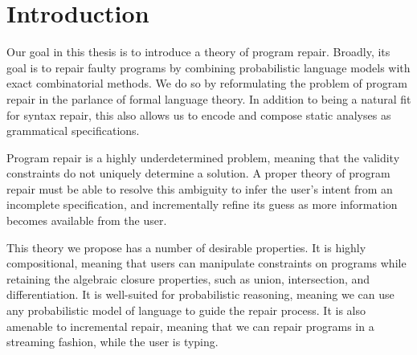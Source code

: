 \chapter*{\rm\bfseries Introduction}
\label{ch:introduction}


Our goal in this thesis is to introduce a theory of program repair. Broadly, its goal is to repair faulty programs by combining probabilistic language models with exact combinatorial methods. We do so by reformulating the problem of program repair in the parlance of formal language theory. In addition to being a natural fit for syntax repair, this also allows us to encode and compose static analyses as grammatical specifications.

Program repair is a highly underdetermined problem, meaning that the validity constraints do not uniquely determine a solution. A proper theory of program repair must be able to resolve this ambiguity to infer the user's intent from an incomplete specification, and incrementally refine its guess as more information becomes available from the user.

This theory we propose has a number of desirable properties. It is highly compositional, meaning that users can manipulate constraints on programs while retaining the algebraic closure properties, such as union, intersection, and differentiation. It is well-suited for probabilistic reasoning, meaning we can use any probabilistic model of language to guide the repair process. It is also amenable to incremental repair, meaning that we can repair programs in a streaming fashion, while the user is typing.